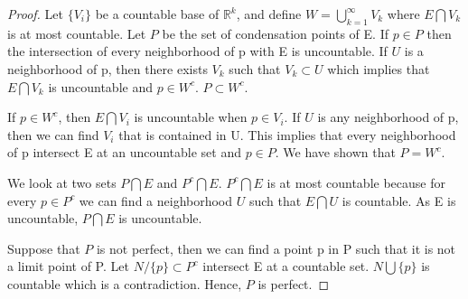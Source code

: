 \documentclass{article}
\theoremstyle{plain}
\theoremstyle{definition}
\begin{document}
\begin{proof}
	Let $\{V_{i}\}$ be a countable base of $\mathbb{R}^{k}$, and define $W = \bigcup_{k = 1}^{\infty} V_{k}$ where $E \bigcap V_{k}$ is at most countable. Let $P$ be the set of condensation points of E. If $p \in P$ then the intersection of every neighborhood of p with E is uncountable. If $U$ is a neighborhood of p, then there exists $V_{k}$ such that $V_{k} \subset U$ which implies that $E \bigcap V_{k}$ is uncountable and $p \in W^{c}$. $P \subset W^{c}$.
	
	If $p \in W^{c}$, then $E \bigcap V_{i}$ is uncountable when $p \in V_{i}$. If $U$ is any neighborhood of p, then we can find $V_{i}$ that is contained in U. This implies that every neighborhood of p intersect E at an uncountable set and $p \in P$. We have shown that $P = W^{c}$.

	We look at two sets $P \bigcap E$ and $P^{c} \bigcap E$. $P^{c} \bigcap E$ is at most countable because for every $p \in P^{c}$ we can find a neighborhood $U$ such that $E \bigcap U$ is countable. As E is uncountable, $P \bigcap E$ is uncountable.

	Suppose that $P$ is not perfect, then we can find a point p in P such that it is not a limit point of P. Let $N / \{ p \} \subset P^{c}$ intersect E at a countable set. $N \bigcup \{ p \}$ is countable which is a contradiction. Hence, $P$ is perfect.
\end{proof}
\end{document}
